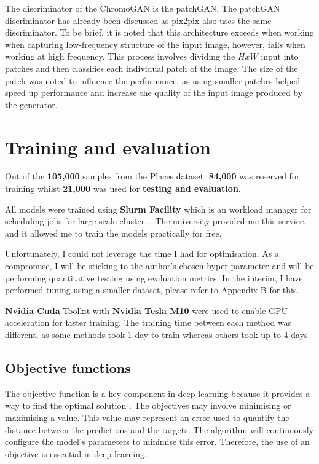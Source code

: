 The discriminator of the ChromoGAN is the patchGAN. The patchGAN discriminator has already been discussed as pix2pix also uses the same discriminator. To be brief, it is noted that this architecture exceeds when working when capturing low-frequency structure of the input image, however, fails when working at high frequency. This process involves dividing the \(H x W\) input into patches and then classifies each individual patch of the image. The size of the patch was noted to influence the performance, as using smaller patches helped speed up performance and increase the quality of the input image produced by the generator.




\pagebreak
\section{Training and evaluation}
 Out of the \textbf{105,000} samples from the Places dataset, \textbf{84,000} was reserved for training whilst \textbf{21,000} was used for\textbf{ testing and evaluation}.

All models were trained using \textbf{Slurm Facility} which is an workload manager for scheduling jobs for large scale cluster. \cite{enwiki:1078654743}. The university provided me this service, and it allowed me to train the models practically for free.

Unfortunately, I could not leverage the time I had for optimisation. As a compromise, I will be sticking to the author's chosen hyper-parameter and will be performing quantitative testing using evaluation metrics. In the interim, I have performed tuning using a smaller dataset, please refer to Appendix B for this. 

\textbf{Nvidia Cuda} Toolkit with\textbf{ Nvidia Tesla M10} were used to enable GPU acceleration for faster training. The training time between each method was different, as some methods took 1 day to train whereas others took up to 4 days. 


\subsection{Objective functions}
The objective function is a key component in deep learning because it provides a way to find the optimal solution \cite{kronovet_2017}. The objectives may involve minimising or maximising a value. This value may represent an error used to quantify the distance between the predictions and the targets. The algorithm will continuously configure the model's parameters to minimise this error. Therefore, the use of an objective is essential in deep learning.

